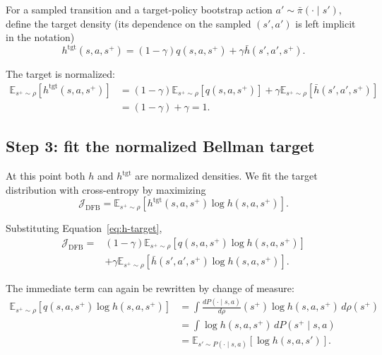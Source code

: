 \documentclass[11pt]{article}
\begin{document}
For a sampled transition and a target-policy bootstrap action $a'\sim\bar\pi(\cdot\mid s'),$ define the target density (its dependence on the sampled $(s',a')$ is left implicit in the notation)
\begin{equation}
    \boxed{ h^{\mathrm{tgt}}(s,a,s^+) = (1-\gamma)q(s,a,s^+) + \gamma \bar h(s',a',s^+). }
    \label{eq:h-target}
\end{equation}

The target is normalized:
\begin{equation}
\begin{aligned}
\mathbb E_{s^+\sim\rho} \left[ h^{\mathrm{tgt}}(s,a,s^+) \right] &= (1-\gamma) \mathbb E_{s^+\sim\rho} [q(s,a,s^+)]
                                                                    + \gamma \mathbb E_{s^+\sim\rho} [\bar h(s',a',s^+)] \\
                                                                 &= (1-\gamma) + \gamma = 1.
\end{aligned}
\end{equation}

\subsection*{Step 3: fit the normalized Bellman target}

At this point both $h$ and $h^{\mathrm{tgt}}$ are normalized densities. 
We fit the target distribution with cross-entropy by maximizing
\begin{equation}
    \mathcal J_{\mathrm{DFB}} = \mathbb E_{s^+\sim\rho} \left[ h^{\mathrm{tgt}}(s,a,s^+) \log h(s,a,s^+) \right].
\label{eq:dfb-ce}
\end{equation}

Substituting Equation~\eqref{eq:h-target},
\begin{equation}
\begin{aligned}
    \mathcal J_{\mathrm{DFB}} ={}& (1-\gamma) \mathbb E_{s^+\sim\rho} \left[ q(s,a,s^+) \log h(s,a,s^+) \right] \\
                                &+ \gamma \mathbb E_{s^+\sim\rho} \left[ \bar h(s',a',s^+) \log h(s,a,s^+) \right].
\end{aligned}
    \label{eq:dfb-expanded}
\end{equation}

The immediate term can again be rewritten by change of measure:
\begin{align}
    \mathbb E_{s^+\sim\rho} \left[ q(s,a,s^+) \log h(s,a,s^+) \right] &= \int \frac{dP(\cdot\mid s,a)}{d\rho}(s^+) \log h(s,a,s^+) \,d\rho(s^+) \\
    &= \int \log h(s,a,s^+) \,dP(s^+\mid s,a) \\
    &= \mathbb E_{s'\sim P(\cdot\mid s,a)} \left[ \log h(s,a,s')\right].
\label{eq:change-measure-h}
\end{align}
\end{document}
